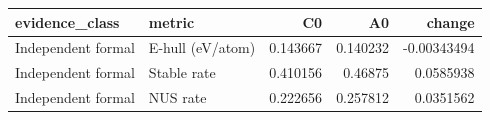 \begin{tabular}{llrrr}
\toprule
evidence_class & metric & C0 & A0 & change \\
\midrule
Independent formal & E-hull (eV/atom) & 0.143667 & 0.140232 & -0.00343494 \\
Independent formal & Stable rate & 0.410156 & 0.46875 & 0.0585938 \\
Independent formal & NUS rate & 0.222656 & 0.257812 & 0.0351562 \\
\bottomrule
\end{tabular}
